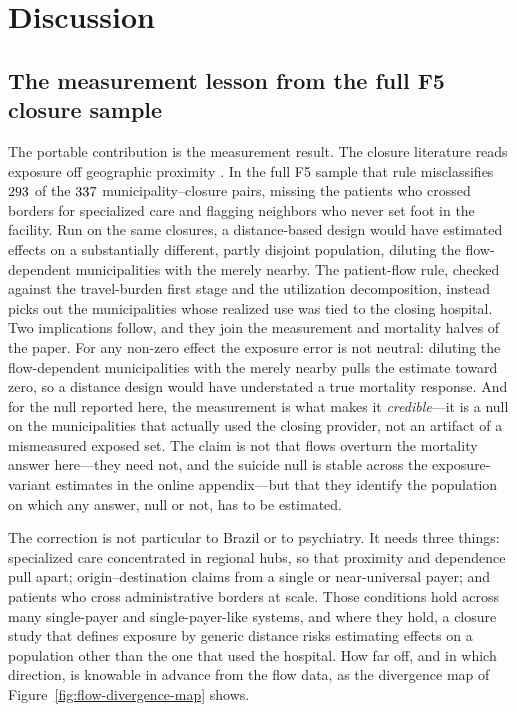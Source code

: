 \section{Discussion}
\label{sec:discussion}

\subsection{The measurement lesson from the full F5 closure sample}
\label{sec:discussion-generalize}

The portable contribution is the measurement result. The closure
literature reads exposure off geographic proximity \citep{buchmueller2006,
avdic2016, carroll2019, joynt2015, lindrooth2018}. In the full F5 sample that rule
misclassifies $293$ of the $337$
municipality--closure pairs, missing the patients who crossed borders for
specialized care and flagging neighbors who never set foot in the
facility. Run on the same closures, a distance-based design would have
estimated effects on a substantially different, partly disjoint
population, diluting the flow-dependent municipalities with the merely
nearby. The patient-flow rule, checked against the travel-burden first
stage and the utilization decomposition, instead picks out the
municipalities whose realized use was tied to the closing hospital.
 Two implications follow, and they join the measurement and mortality halves of the paper. For any non-zero effect the exposure error is not neutral: diluting the flow-dependent municipalities with the merely nearby pulls the estimate toward zero, so a distance design would have understated a true mortality response. And for the null reported here, the measurement is what makes it \emph{credible}---it is a null on the municipalities that actually used the closing provider, not an artifact of a mismeasured exposed set. The claim is not that flows overturn the mortality answer here---they need not, and the suicide null is stable across the exposure-variant estimates in the online appendix---but that they identify the population on which any answer, null or not, has to be estimated.

The correction is not particular to Brazil or to psychiatry. It needs
three things: specialized care concentrated in regional hubs, so that
proximity and dependence pull apart; origin--destination claims from a
single or near-universal payer; and patients who cross administrative
borders at scale. Those conditions hold across many single-payer and
single-payer-like systems, and where they hold, a closure study that
defines exposure by generic distance risks estimating effects on a
population other than the one that used the hospital. How far off, and in
which direction, is knowable in advance from the flow data, as the
divergence map of Figure~\ref{fig:flow-divergence-map} shows.

